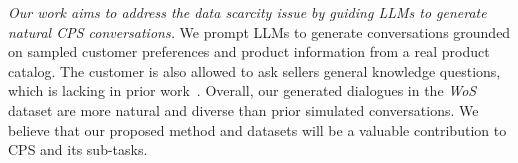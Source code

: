 \textit{Our work aims to address the data scarcity issue by guiding LLMs to generate natural CPS conversations.} We prompt LLMs to generate conversations grounded on sampled customer preferences and product information from a real product catalog. %
The customer is also allowed to ask sellers general knowledge questions, %
which is lacking in prior work~\cite{zhang2018towards,bi2019conversational,zou2022learning}. Overall, our generated dialogues in the \textit{WoS} dataset are more natural and diverse than prior simulated conversations. 
We believe that our proposed method and datasets will be a valuable contribution to CPS and its sub-tasks.

\vspace{-0.5em}
